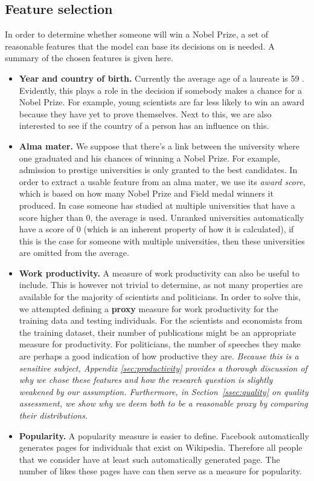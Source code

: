 \subsection{Feature selection}
\label{ssec:features}
In order to determine whether someone will win a Nobel Prize, a set of reasonable features that the model can base its decisions on is needed. A summary of the chosen features is given here. 
\begin{itemize}
\item \textbf{Year and country of birth.}
Currently the average age of a laureate is 59 \cite{age}. Evidently, this plays a role in the decision if somebody makes a chance for a Nobel Prize. For example, young scientists are far less likely to win an award because they have yet to prove themselves. Next to this, we are also interested to see if the country of a person has an influence on this.
\item \textbf{Alma mater.} We suppose that there's a link between the university where one graduated and his chances of winning a Nobel Prize. For example, admission to prestige universities is only granted to the best candidates. In order to extract a usable feature from an alma mater, we use its \emph{award score}, which is based on how many Nobel Prize and Field medal winners it produced. In case someone has studied at multiple universities that have a score higher than 0, the average is used. Unranked universities automatically have a score of 0 (which is an inherent property of how it is calculated), if this is the case for someone with multiple universities, then these universities are omitted from the average.
\item \textbf{Work productivity.} A measure of work productivity can also be useful to include. This is however not trivial to determine, as not many properties are available for the majority of scientists and politicians. In order to solve this, we attempted defining a \textbf{proxy} measure for work productivity for the training data and testing individuals. For the scientists and economists from the training dataset, their number of publications might be an appropriate measure for productivity. For politicians, the number of speeches they make are perhaps a good indication of how productive they are. \emph{Because this is a sensitive subject, Appendix \ref{sec:productivity} provides a thorough discussion of why we chose these features and how the research question is slightly weakened by our assumption. Furthermore, in Section~\ref{ssec:quality} on quality assessment, we show why we deem both to be a reasonable proxy by comparing their distributions.}
\item \textbf{Popularity.} A popularity measure is easier to define. Facebook automatically generates pages for individuals that exist on Wikipedia. Therefore all people that we consider have at least such automatically generated page. The number of likes these pages have can then serve as a measure for popularity. 
\end{itemize}

